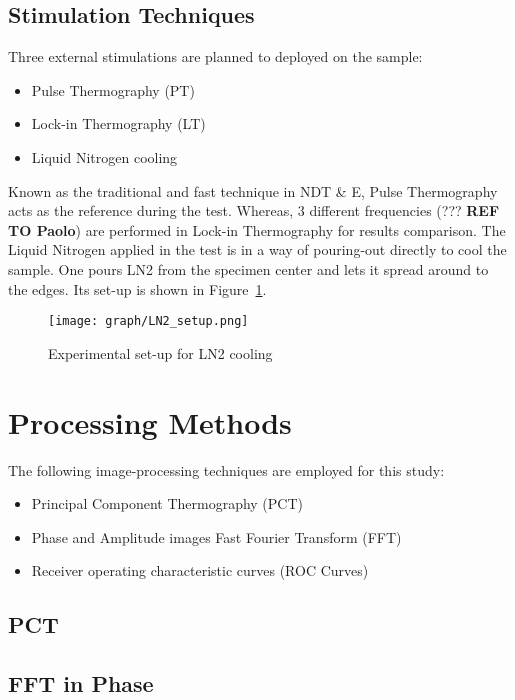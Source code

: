 \documentclass[]{spie}  %
\begin{document}
\subsection{Stimulation Techniques} %
\label{sub:stimulation_techniques}
Three external stimulations are planned to deployed on the sample: 
\begin{itemize}
   \item Pulse Thermography (PT) 
   \item Lock-in Thermography (LT)
   \item Liquid Nitrogen cooling 
\end{itemize}
Known as the traditional and fast technique in NDT \& E, Pulse Thermography acts as the reference during the test. Whereas, 3 different frequencies (??? \textbf{REF TO Paolo}) are performed in Lock-in Thermography for results comparison. The Liquid Nitrogen applied in the test is in a way of pouring-out directly to cool the sample. One pours LN2 from the specimen center and lets it spread around to the edges. Its set-up is shown in Figure~\ref{Exp_LN2}.

\begin{figure}[ht]
   \centering
   \texttt{[image: graph/LN2\_setup.png]}
   \caption{Experimental set-up for LN2 cooling}
   \label{Exp_LN2}
\end{figure}




\section{Processing Methods} %
\label{sec:processing_methods}
The following image-processing techniques are employed for this study:
\begin{itemize}
   \item Principal Component Thermography (PCT)
   \item Phase and Amplitude images Fast Fourier Transform (FFT)
   \item Receiver operating characteristic curves (ROC Curves)
\end{itemize}

\subsection{PCT}

\subsection{FFT in Phase}
\end{document}
